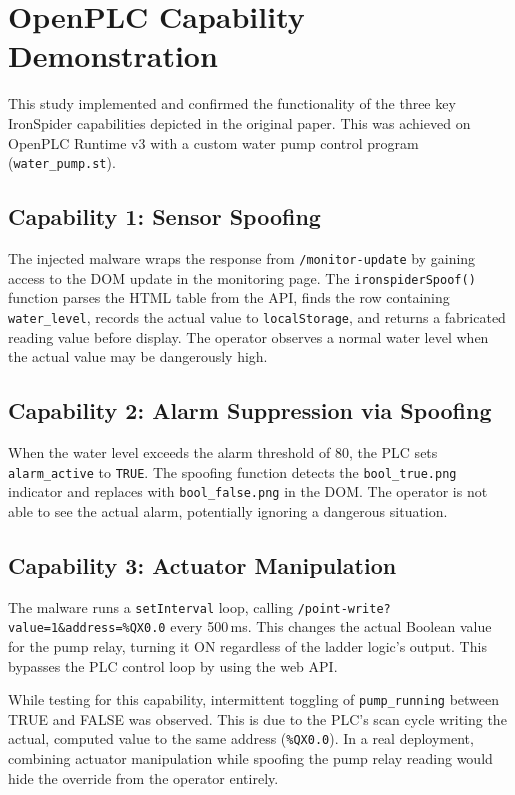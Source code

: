 \documentclass[conference]{IEEEtran}
\begin{document}
\section{OpenPLC Capability Demonstration}
\label{sec:openplc}

This study implemented and confirmed the functionality of the three key IronSpider capabilities depicted in the original paper. This was achieved on OpenPLC Runtime v3 with a custom water pump control program (\texttt{water\_pump.st}).

\subsection{Capability 1: Sensor Spoofing}

The injected malware wraps the response from \texttt{/monitor-update} by gaining access to the DOM update in the monitoring page. The \texttt{ironspiderSpoof()} function parses the HTML table from the API, finds the row containing \texttt{water\_level}, records the actual value to \texttt{localStorage}, and returns a fabricated reading value before display. The operator observes a normal water level when the actual value may be dangerously high.

\subsection{Capability 2: Alarm Suppression via Spoofing}

When the water level exceeds the alarm threshold of 80, the PLC sets \texttt{alarm\_active} to \texttt{TRUE}. The spoofing function detects the \texttt{bool\_true.png} indicator and replaces with \texttt{bool\_false.png} in the DOM. The operator is not able to see the actual alarm, potentially ignoring a dangerous situation.

\subsection{Capability 3: Actuator Manipulation}

The malware runs a \texttt{setInterval} loop, calling \texttt{/point-write?value=1\&address=\%QX0.0} every 500\,ms. This changes the actual Boolean value for the pump relay, turning it ON regardless of the ladder logic's output. This bypasses the PLC control loop by using the web API.

While testing for this capability, intermittent toggling of \texttt{pump\_running} between TRUE and FALSE was observed. This is due to the PLC's scan cycle writing the actual, computed value to the same address (\texttt{\%QX0.0}). In a real deployment, combining actuator manipulation while spoofing the pump relay reading would hide the override from the operator entirely.
\end{document}
